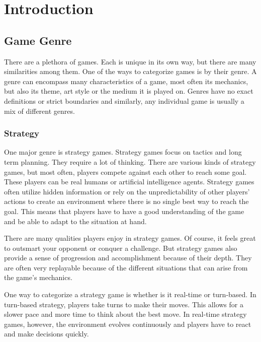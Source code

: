 \chapter{Introduction}


\section{Game Genre}

There are a plethora of games. Each is unique in its own way, but there are many similarities among them. One of the ways to categorize games is by their genre. A genre can encompass many characteristics of a game, most often its mechanics, but also its theme, art style or the medium it is played on. Genres have no exact definitions or strict boundaries and similarly, any individual game is usually a mix of different genres.

\subsection{Strategy}

One major genre is strategy games. Strategy games focus on tactics and long term planning. They require a lot of thinking. There are various kinds of strategy games, but most often, players compete against each other to reach some goal. These players can be real humans or artificial intelligence agents. Strategy games often utilize hidden information or rely on the unpredictability of other players' actions to create an environment where there is no single best way to reach the goal. This means that players have to have a good understanding of the game and be able to adapt to the situation at hand.

There are many qualities players enjoy in strategy games. Of course, it feels great to outsmart your opponent or conquer a challenge. But strategy games also provide a sense of progression and accomplishment because of their depth. They are often very replayable because of the different situations that can arise from the game's mechanics.

One way to categorize a strategy game is whether is it real-time or turn-based. In turn-based strategy, players take turns to make their moves. This allows for a slower pace and more time to think about the best move. In real-time strategy games, however, the environment evolves continuously and players have to react and make decisions quickly.

